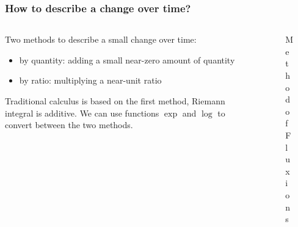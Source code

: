 \documentclass[aspectratio=169]{beamer}
\begin{document}
\begin{frame}
    \frametitle{How to describe a change over time?}
    \begin{columns}
        \begin{column}{0.7\textwidth}
            Two methods to describe a small change over time:
            \begin{itemize}
                \item by quantity: adding a small near-zero amount of quantity
                \item by ratio: multiplying a near-unit ratio
            \end{itemize}
            Traditional calculus is based on the first method, Riemann integral is additive.
            We can use functions $\exp$ and $\log$ to convert between the two methods.
        \end{column}
        \begin{column}{0.3\textwidth}
            \begin{figure}[ht]\centering
            \caption{Method of Fluxions}
            \end{figure}
        \end{column}
    \end{columns}
\end{frame}
\end{document}
